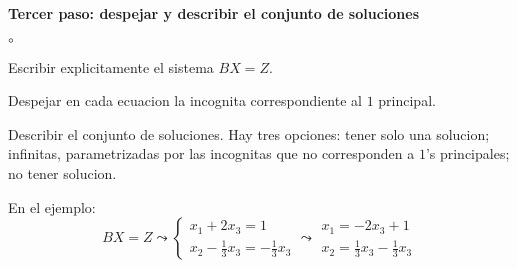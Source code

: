 \documentclass{article}
\theoremstyle{definition}
\theoremstyle{definition}
\theoremstyle{remark}
\begin{document}
\textbf{Tercer paso: despejar y describir el conjunto de soluciones}
\begin{list}{$\circ$}{}  
\item Escribir explicitamente el sistema $BX=Z$. 
\item Despejar en cada ecuacion la incognita correspondiente al $1$ principal.
\item Describir el conjunto de soluciones. Hay tres opciones: tener solo una solucion; infinitas, parametrizadas por las incognitas que no corresponden a $1$'s principales; no tener solucion.
\end{list}
En el ejemplo: \[
  BX=Z \leadsto \left\{\begin{array}{lll} x_1 + 2x_3 = 1 \\ x_2 - \frac{1}{3}x_3 = -\frac{1}{3}x_3 \end{array}\right. \leadsto \begin{array}{lll} x_1=-2x_3+1 \\
x_2=\frac{1}{3}x_3-\frac{1}{3}x_3\end{array}
\]
\end{document}
